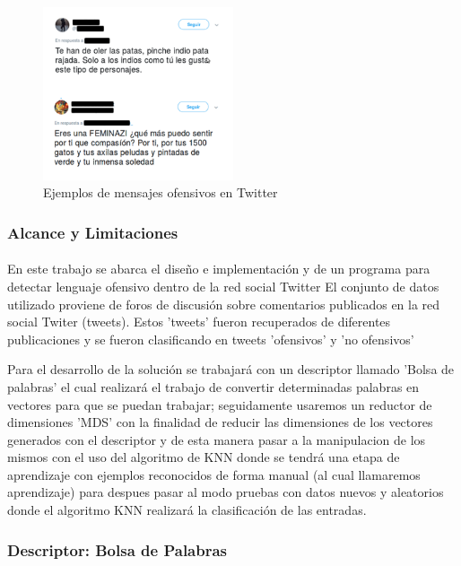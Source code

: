 \documentclass{article}
\begin{document}
\begin{figure}[h!]
	\centering
	\includegraphics[width=0.5\textwidth]{img/tweets_ofensivos.png}
	\caption{Ejemplos de mensajes ofensivos en Twitter}
	\label{fig:tweets_ofensivos}
\end{figure}

\clearpage
\subsubsection{Alcance y Limitaciones}
\paragraph{}
En este trabajo se abarca el diseño e implementación y de un programa para detectar lenguaje ofensivo dentro de la red social Twitter
El conjunto de datos utilizado proviene de foros de discusión sobre comentarios publicados en la red social Twiter (tweets). Estos 'tweets' fueron recuperados de diferentes publicaciones y se fueron clasificando en tweets 'ofensivos' y 'no ofensivos'

Para el desarrollo de la solución se trabajará con un descriptor llamado 'Bolsa de palabras' el cual realizará el trabajo de convertir determinadas palabras en vectores para que se puedan trabajar; seguidamente usaremos un reductor de dimensiones 'MDS' con la finalidad de reducir las dimensiones de los vectores generados con el descriptor y de esta manera pasar a la manipulacion de los mismos con el uso del algoritmo de KNN donde se tendrá una etapa de aprendizaje con ejemplos reconocidos de forma manual (al cual llamaremos aprendizaje) para despues pasar al modo pruebas con datos nuevos y aleatorios donde el algoritmo KNN realizará la clasificación de las entradas. 

\subsubsection{Descriptor: Bolsa de Palabras}
\end{document}
